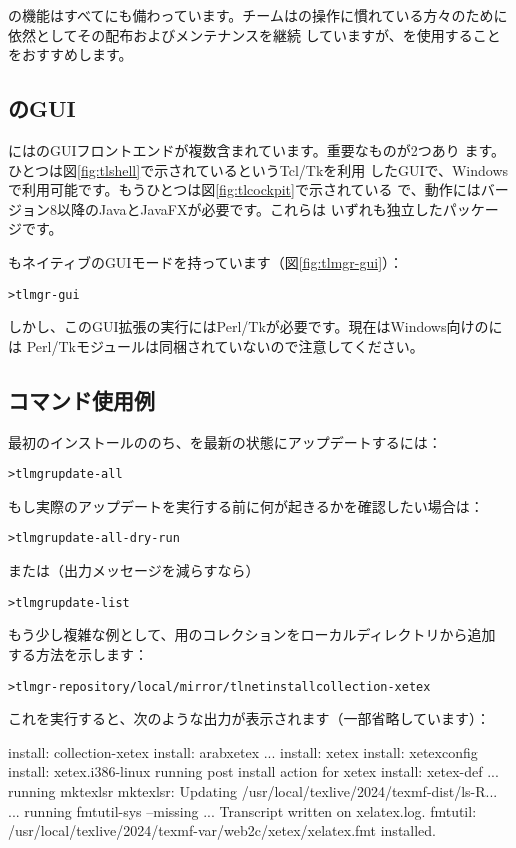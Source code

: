 \documentclass[uplatex,dvipdfmx,12pt,tombow]{jsarticle}
\begin{document}
の機能はすべてにも備わっています。\TL チームはの操作に慣れている方々のために依然としてその配布およびメンテナンスを継続
していますが、を使用することをおすすめします。

\subsection{のGUI}

\TL にはのGUIフロントエンドが複数含まれています。重要なものが2つあり
ます。ひとつは図\ref{fig:tlshell}で示されているというTcl/Tkを利用
したGUIで、Windowsで利用可能です。もうひとつは図\ref{fig:tlcockpit}で示されている
で、動作にはバージョン8以降のJavaとJavaFXが必要です。これらは
いずれも独立したパッケージです。

もネイティブのGUIモードを持っています（図\ref{fig:tlmgr-gui}）：
%
\begin{alltt}
> tlmgr -gui
\end{alltt}
%
しかし、このGUI拡張の実行にはPerl/Tkが必要です。現在はWindows向けの\TL には
Perl/Tkモジュールは同梱されていないので注意してください。

\subsection{コマンド使用例}

最初のインストールののち、\TL を最新の状態にアップデートするには：
%
\begin{alltt}
> tlmgr update -all
\end{alltt}
%
もし実際のアップデートを実行する前に何が起きるかを確認したい場合は：
%
\begin{alltt}
> tlmgr update -all -dry-run
\end{alltt}
%
または（出力メッセージを減らすなら）
%
\begin{alltt}
> tlmgr update -list
\end{alltt}

もう少し複雑な例として、\XeTeX 用のコレクションをローカルディレクトリから追加
する方法を示します：
%
\begin{alltt}
> tlmgr -repository /local/mirror/tlnet install collection-xetex
\end{alltt}
%
これを実行すると、次のような出力が表示されます（一部省略しています）：
%
\begin{fverbatim}
install: collection-xetex
install: arabxetex
...
install: xetex
install: xetexconfig
install: xetex.i386-linux
running post install action for xetex
install: xetex-def
...
running mktexlsr
mktexlsr: Updating /usr/local/texlive/2024/texmf-dist/ls-R...
...
running fmtutil-sys --missing
...
Transcript written on xelatex.log.
fmtutil: /usr/local/texlive/2024/texmf-var/web2c/xetex/xelatex.fmt installed.
\end{fverbatim}
\end{document}
